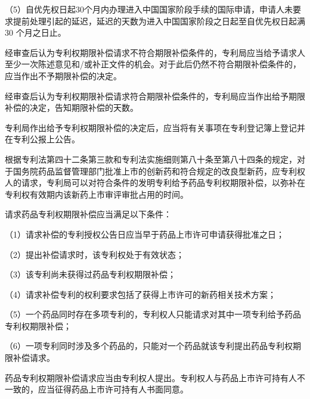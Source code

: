 {\setlength{\parindent}{17.1bp}（5）自优先权日起30个月内办理进入中国国家阶段手续的国际申请，申请人未要求提前处理引起的延迟，延迟的天数为进入中国国家阶段之日起至自优先权日起满30 个月之日止。\par}

经审查后认为专利权期限补偿请求不符合期限补偿条件的，专利局应当给予请求人至少一次陈述意见和/或补正文件的机会。对于此后仍然不符合期限补偿条件的，应当作出不予期限补偿的决定。

经审查后认为专利权期限补偿请求符合期限补偿条件的，专利局应当作出给予期限补偿的决定，告知期限补偿的天数。

专利局作出给予专利权期限补偿的决定后，应当将有关事项在专利登记簿上登记并在专利公报上公告。

根据专利法第四十二条第三款和专利法实施细则第八十条至第八十四条的规定，对于国务院药品监督管理部门批准上市的创新药和符合规定的改良型新药，应专利权人的请求，专利局可以对符合条件的发明专利给予药品专利权期限补偿，以弥补在专利权有效期内该新药上市审评审批占用的时间。

请求药品专利权期限补偿应当满足以下条件：

{\setlength{\parindent}{17.1bp}（1）请求补偿的专利授权公告日应当早于药品上市许可申请获得批准之日；\par}

{\setlength{\parindent}{17.1bp}（2）提出补偿请求时，该专利权处于有效状态；\par}

{\setlength{\parindent}{17.1bp}（3）该专利尚未获得过药品专利权期限补偿；\par}

{\setlength{\parindent}{17.1bp}（4）请求补偿专利的权利要求包括了获得上市许可的新药相关技术方案；\par}

{\setlength{\parindent}{17.1bp}（5）一个药品同时存在多项专利的，专利权人只能请求对其中一项专利给予药品专利权期限补偿；\par}

{\setlength{\parindent}{17.1bp}（6）一项专利同时涉及多个药品的，只能对一个药品就该专利提出药品专利权期限补偿请求。\par}

药品专利权期限补偿请求应当由专利权人提出。专利权人与药品上市许可持有人不一致的，应当征得药品上市许可持有人书面同意。

